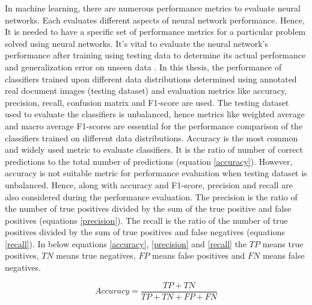 In machine learning, there are numerous performance metrics to evaluate neural networks. Each evaluates different aspects of neural network performance. Hence, It is needed to have a specific set of performance metrics for a particular problem solved using neural networks. It's vital to evaluate the neural network's performance after training using testing data to determine its actual performance and generalization error on unseen data \cite{powers2020evaluation}. In this thesis, the performance of classifiers trained upon different data distributions determined using annotated real document images (testing dataset) and evaluation metrics like accuracy, precision, recall, confusion matrix and F1-score are used. The testing dataset used to evaluate the classifiers is unbalanced, hence metrics like weighted average and macro average F1-scores are essential for the performance comparison of the classifiers trained on different data distributions. Accuracy is the most common and widely used metric to evaluate classifiers\footnotemark. It is the ratio of number of correct predictions to the total number of predictions (equation \ref{accuracy}). However, accuracy is not suitable metric for performance evaluation when testing dataset is unbalanced. Hence, along with accuracy and F1-score, precision and recall are also considered during the performance evaluation. The precision is the ratio of the number of true positives divided by the sum of the true positive and false positives (equations \ref{precision}). The recall is the ratio of the number of true positives divided by the sum of true positives and false negatives (equations \ref{recall}). In below equations \ref{accuracy}, \ref{precision} and \ref{recall} the $TP$ means true positives, $TN$ means true negatives, $FP$ means false positives and $FN$ means false negatives.


\begin{equation}\label{accuracy}
\textit{Accuracy} = \frac{TP + TN}{TP +TN+ FP + FN}
\end{equation}


